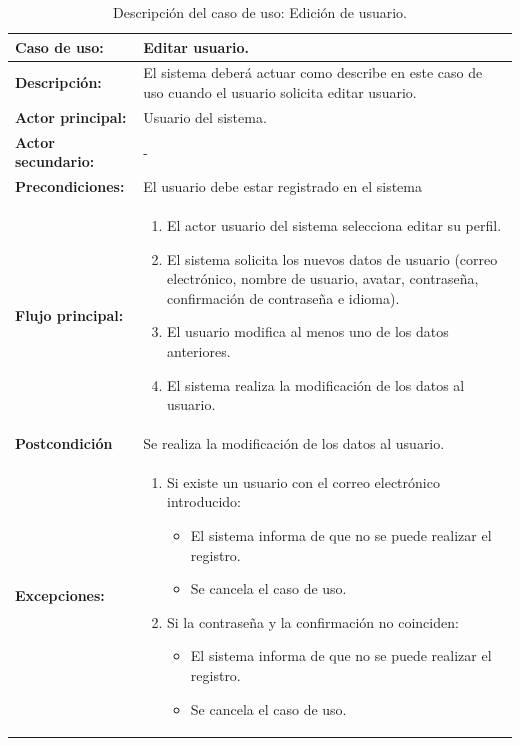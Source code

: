 \begin{table}[H]
  \begin{center}
    \begin{tabular}{|p{3.5cm}|p{10cm}|}
      \hline
      {\textbf{Caso de uso:}} & { Editar usuario.} \\
      \hline
      {\textbf{Descripción:}} & { El sistema deberá actuar como describe en este caso de uso cuando el usuario solicita editar usuario.} \\
     \hline
      {\textbf{Actor principal:}} & { Usuario del sistema.} \\
      \hline
      {\textbf{Actor secundario:}} & { - } \\
      \hline
      {\textbf{Precondiciones:}} & { El usuario debe estar registrado en el sistema } \\
     \hline   
    {\textbf{Flujo principal:}} & { 
      \begin{enumerate}
	\item El actor usuario del sistema selecciona editar su perfil.
	\item El sistema solicita los nuevos datos de usuario (correo electrónico, nombre de usuario, avatar, contraseña, confirmación de contraseña e idioma).
	\item El usuario modifica al menos uno de los datos anteriores.
	\item El sistema realiza la modificación de los datos al usuario.
      \end{enumerate}
      } \\
     \hline
     {\textbf{Postcondición}} & {Se realiza la modificación de los datos al usuario.}\\
     \hline
     
      {\textbf{Excepciones:}} & {
	\begin{enumerate}
	\item Si existe un usuario con el correo electrónico introducido:
	\begin{itemize}
	  \item El sistema informa de que no se puede realizar el registro.
	  \item Se cancela el caso de uso.
	\end{itemize}
	\item Si la contraseña y la confirmación no coinciden:
	  \begin{itemize}
	    \item El sistema informa de que no se puede realizar el registro.
	    \item Se cancela el caso de uso.
	  \end{itemize}
	\end{enumerate}
	}\\
      \hline
    \end{tabular}
  \end{center}
\caption{Descripción del caso de uso: Edición de usuario.}
\end{table}


